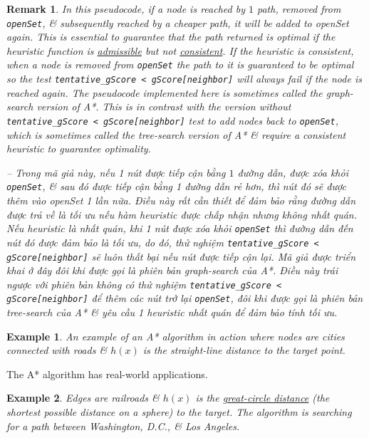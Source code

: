\documentclass{article}
\newtheorem{example}{Example}
\newtheorem{remark}{Remark}
\begin{document}
\begin{remark}
    In this pseudocode, if a node is reached by $1$ path, removed from {\tt openSet}, \& subsequently reached by a cheaper path, it will be added to openSet again. This is essential to guarantee that the path returned is optimal if the heuristic function is \href{https://en.wikipedia.org/wiki/Admissible_heuristic}{admissible} but not \href{https://en.wikipedia.org/wiki/Consistent_heuristic}{consistent}. If the heuristic is consistent, when a node is removed from {\tt openSet} the path to it is guaranteed to be optimal so the test \verb|tentative_gScore < gScore[neighbor]| will always fail if the node is reached again. The pseudocode implemented here is sometimes called the {\rm graph-search} version of A*. This is in contrast with the version without \verb|tentative_gScore < gScore[neighbor]| test to add nodes back to {\tt openSet}, which is sometimes called the {\rm tree-search} version of A* \& require a consistent heuristic to guarantee optimality.
    
    -- Trong mã giả này, nếu 1 nút được tiếp cận bằng $1$ đường dẫn, được xóa khỏi {\tt openSet}, \& sau đó được tiếp cận bằng 1 đường dẫn rẻ hơn, thì nút đó sẽ được thêm vào openSet 1 lần nữa. Điều này rất cần thiết để đảm bảo rằng đường dẫn được trả về là tối ưu nếu hàm heuristic được chấp nhận nhưng không nhất quán. Nếu heuristic là nhất quán, khi 1 nút được xóa khỏi {\tt openSet} thì đường dẫn đến nút đó được đảm bảo là tối ưu, do đó, thử nghiệm \verb|tentative_gScore < gScore[neighbor]| sẽ luôn thất bại nếu nút được tiếp cận lại. Mã giả được triển khai ở đây đôi khi được gọi là phiên bản {\rm graph-search} của A*. Điều này trái ngược với phiên bản không có thử nghiệm \verb|tentative_gScore < gScore[neighbor]| để thêm các nút trở lại {\tt openSet}, đôi khi được gọi là phiên bản {\rm tree-search} của A* \& yêu cầu 1 heuristic nhất quán để đảm bảo tính tối ưu.
\end{remark}

\begin{example}
    An example of an A* algorithm in action where nodes are cities connected with roads \& $h(x)$ is the straight-line distance to the target point. 
\end{example}
The A* algorithm has real-world applications.

\begin{example}
    Edges are railroads \& $h(x)$ is the \href{https://en.wikipedia.org/wiki/Great-circle_distance}{great-circle distance} (the shortest possible distance on a sphere) to the target. The algorithm is searching for a path between Washington, D.C., \& Los Angeles.
\end{example}
\end{document}
